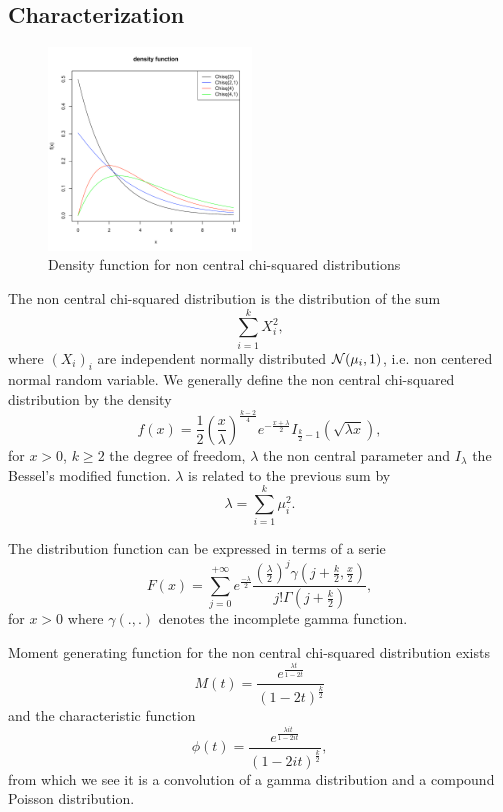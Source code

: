 \subsection{Characterization}
\begin{figure}
  \vspace{-20pt}
  \begin{center}
    \includegraphics[width=0.48\textwidth]{img/noncentrchisqzoom}
  \end{center}
  \vspace{-20pt}  
  \caption{Density function for non central chi-squared distributions}
\end{figure}
The non central chi-squared distribution is the distribution of the sum
$$
\sum_{i=1}^k X_i^2,
$$
where $(X_i)_i$ are independent normally distributed $\mathcal N(\mu_i,1)$, 
i.e. non centered normal random variable. We generally define the non central
chi-squared distribution by the density
$$
f(x) =  \frac{1}{2} \left(\frac{x}{\lambda}\right)^{\frac{k-2}{4}}  e^{-\frac{x+\lambda}{2} } I_{\frac{k}{2}-1} \left(\sqrt{\lambda x}\right) ,
$$
for $x>0$, $k\geq 2$ the degree of freedom, $\lambda$ the non central parameter and $I_\lambda$ the Bessel's modified function. $\lambda$ is related to the previous sum by 
$$
\lambda = \sum_{i=1}^k \mu_i^2.
$$

The distribution function can be expressed in terms of a serie
$$
F(x) = \sum_{j=0}^{+\infty} e^{\frac{-\lambda}{2}} \frac{(\frac{\lambda}{2})^j \gamma(j+\frac{k}{2},\frac{x}{2})}{j!\Gamma(j+\frac{k}{2})} ,
$$
for $x>0$ where $\gamma(.,.)$ denotes the incomplete gamma function.

Moment generating function for the non central chi-squared distribution exists
$$
M(t) = \frac{e^{\frac{\lambda  t}{1-2t}}}{(1-2t)^{\frac{k}{2}}}
$$
and the characteristic function
$$
\phi(t) = \frac{e^{\frac{\lambda i t}{1-2it}}}{(1-2it)^{\frac{k}{2}}},
$$
from which we see it is a convolution of a gamma distribution and a compound Poisson distribution.

